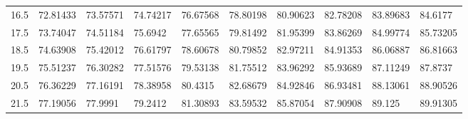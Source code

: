 \documentclass[10pt,twocolumn,letterpaper]{article}
\begin{document}
\begin{table}
\begin{tabular}{llllllllll}
    16.5            & 72.81433                               & 73.57571                               & 74.74217                                & 76.67568                                & 78.80198                                & 80.90623                                & 82.78208                                & 83.89683                                & 84.6177                                 \\
    17.5            & 73.74047                               & 74.51184                               & 75.6942                                 & 77.65565                                & 79.81492                                & 81.95399                                & 83.86269                                & 84.99774                                & 85.73205                                \\
    18.5            & 74.63908                               & 75.42012                               & 76.61797                                & 78.60678                                & 80.79852                                & 82.97211                                & 84.91353                                & 86.06887                                & 86.81663                                \\
    19.5            & 75.51237                               & 76.30282                               & 77.51576                                & 79.53138                                & 81.75512                                & 83.96292                                & 85.93689                                & 87.11249                                & 87.8737                                 \\
    20.5            & 76.36229                               & 77.16191                               & 78.38958                                & 80.4315                                 & 82.68679                                & 84.92846                                & 86.93481                                & 88.13061                                & 88.90526                                \\
    21.5            & 77.19056                               & 77.9991                                & 79.2412                                 & 81.30893                                & 83.59532                                & 85.87054                                & 87.90908                                & 89.125                                  & 89.91305                                \\

\end{tabular}
\end{table}
\end{document}
